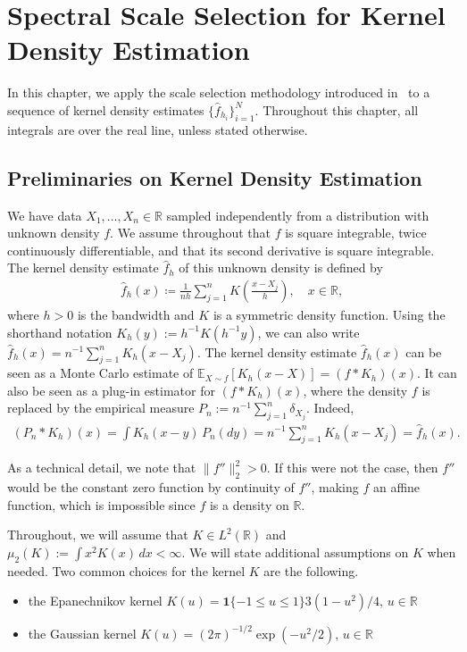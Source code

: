 \chapter{Spectral Scale Selection for Kernel Density Estimation}\label{chap:kde}

In this chapter, we apply the scale selection methodology introduced in~\cite{Baralic2026} to a sequence of kernel density estimates $\{\hat{f}_{h_i}\}_{i=1}^{N}$. Throughout this chapter, all integrals are over the real line, unless stated otherwise.

\section{Preliminaries on Kernel Density Estimation}\label{sec:preliminaries_kde}

We have data $X_1,\dots,X_n\in\mathbb{R}$ sampled independently from a distribution with unknown density $f$. We assume throughout that $f$ is square integrable, twice continuously differentiable, and that its second derivative is square integrable. The kernel density estimate $\hat{f}_h$ of this unknown density is defined by
\begin{align*}
    \hat{f}_h(x)\coloneqq \frac{1}{nh}\sum_{j=1}^{n}K\left(\frac{x-X_j}{h}\right),\quad x\in\mathbb{R},
\end{align*}
\begingroup
\setlength{\emergencystretch}{1em}
where $h>0$ is the bandwidth and $K$ is a symmetric density function. Using the shorthand notation $K_h(y):=h^{-1}K(h^{-1}y)$, we can also write $\hat{f}_h(x)=n^{-1}\sum_{j=1}^{n}K_h(x-X_j)$. The kernel density estimate $\hat{f}_h(x)$ can be seen as a Monte Carlo estimate of $\mathbb{E}_{X\sim f}[K_h(x-X)]=(f\ast K_h)(x)$. It can also be seen as a plug-in estimator for $(f\ast K_h)(x)$, where the density $f$ is replaced by the empirical measure $P_n:=n^{-1}\sum_{j=1}^{n}\delta_{X_j}$. Indeed,
\begin{align}\label{eq:convolution_with_emp_measure}
    (P_n\ast K_h)(x)=\int K_h(x-y)\,P_n(dy)=n^{-1}\sum_{j=1}^{n}K_h(x-X_j)=\hat{f}_h(x).
\end{align}
\par
\endgroup

As a technical detail, we note that $\|f''\|_2^2>0$. If this were not the case, then $f''$ would be the constant zero function by continuity of $f''$, making $f$ an affine function, which is impossible since $f$ is a density on $\mathbb{R}$.

Throughout, we will assume that $K\in L^2(\mathbb{R})$ and $\mu_2(K):=\int x^2K(x)\,dx<\infty$. We will state additional assumptions on $K$ when needed. Two common choices for the kernel $K$ are the following.
\begin{itemize}
    \item the Epanechnikov kernel $K(u)=\mathbf{1}\{-1\le u\le1\}3(1-u^2)/4$, $u\in\mathbb{R}$
    \item the Gaussian kernel $K(u)=(2\pi)^{-1/2}\exp{(-u^2/2)}$, $u\in\mathbb{R}$
\end{itemize}

